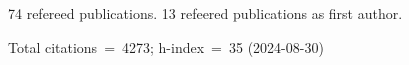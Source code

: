 74 refereed publications. 13 refeered publications as first author.

Total citations~=~4273; h-index~=~35 (2024-08-30)